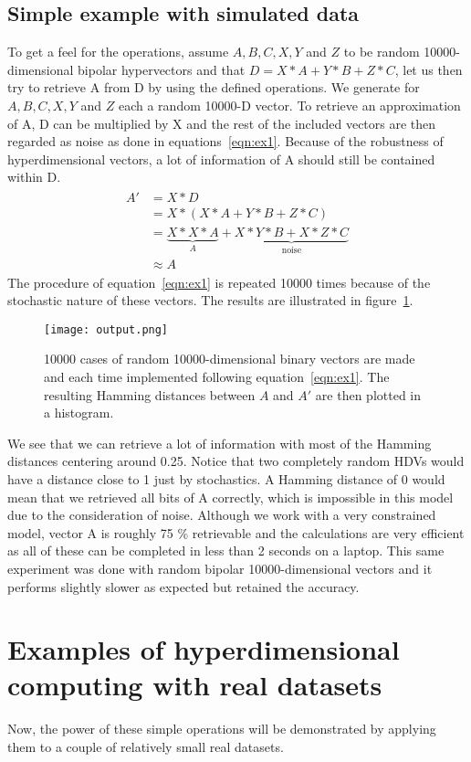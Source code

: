 \subsection*{Simple example with simulated data}
To get a feel for the operations, assume $A, B, C, X, Y$ and $Z$ to be random 10000-dimensional bipolar hypervectors and that $D = X*A + Y*B + Z*C$, let us then try to retrieve A from D by using the defined operations. We generate for $A, B, C, X, Y$ and $Z$ each a random 10000-D vector. To retrieve an approximation of A, D can be multiplied by X and the rest of the included vectors are then regarded as noise as done in equations~\ref{eqn:ex1}. Because of the robustness of hyperdimensional vectors, a lot of information of A should still be contained within D.
\begin{align}\label{eqn:ex1}
\begin{split}
    A' &= X * D \\
    &= X * (X * A + Y * B + Z * C) \\
    &= \underbrace{X * X * A}_A + \underbrace{X * Y * B + X * Z * C}_\text{noise} \\
    &\approx A
\end{split}
\end{align}
 The procedure of equation~\ref{eqn:ex1} is repeated 10000 times because of the stochastic nature of these vectors. The results are illustrated in figure~\ref{fig:exm1}.
\begin{figure}[h]
    \centering
    \texttt{[image: output.png]}
    \caption{10000 cases of random 10000-dimensional binary vectors are made and each time implemented following equation~\ref{eqn:ex1}. The resulting Hamming distances between $A$ and $A'$ are then plotted in a histogram.}
    \label{fig:exm1}
\end{figure}
We see that we can retrieve a lot of information with most of the Hamming distances centering around 0.25. Notice that two completely random HDVs would have a distance close to 1 just by stochastics. A Hamming distance of 0 would mean that we retrieved all bits of A correctly, which is impossible in this model due to the consideration of noise. Although we work with a very constrained model, vector A is roughly 75 \% retrievable and the calculations are very efficient as all of these can be completed in less than 2 seconds on a laptop. This same experiment was done with random bipolar 10000-dimensional vectors and it performs slightly slower as expected but retained the accuracy.
\section{Examples of hyperdimensional computing with real datasets}
\label{sec:example}
Now, the power of these simple operations will be demonstrated by applying them to a couple of relatively small real datasets.
